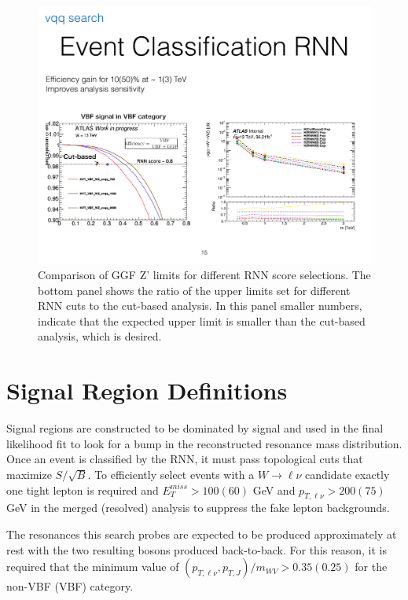 \begin{figure}[h!]
  \centering
  \includegraphics[width=\hsize]{figures/Analysis/rnn_limits.pdf}
  \caption{Comparison of GGF Z' limits for different RNN score selections. The bottom panel shows the ratio of the upper limits set for different RNN cuts to the cut-based analysis. In this panel smaller numbers, indicate that the expected upper limit is smaller than the cut-based analysis, which is desired.} 
  \label{fig:rnn_limits}
\end{figure}
\FloatBarrier

\section{Signal Region Definitions}
\label{Signal Region Definitions}
Signal regions are constructed to be dominated by signal and used in the final likelihood fit to look for a bump in the reconstructed resonance mass distribution. Once an event is classified by the RNN, it must pass topological cuts that maximize $S/\sqrt{B}$. To efficiently select events with a $W\rightarrow \ell \nu$ candidate exactly one tight lepton is required and $E_{T}^{miss} > 100(60)$ GeV and $p_{T,\ell\nu} > 200(75)$ GeV in the merged (resolved) analysis to suppress the fake lepton backgrounds. 

The resonances this search probes are expected to be produced approximately at rest with the two resulting bosons produced back-to-back. For this reason, it is required that the minimum value of $(p_{T, \ell \nu}, p_{T,J})/m_{WV} > 0.35(0.25)$ for the non-VBF (VBF) category. 

